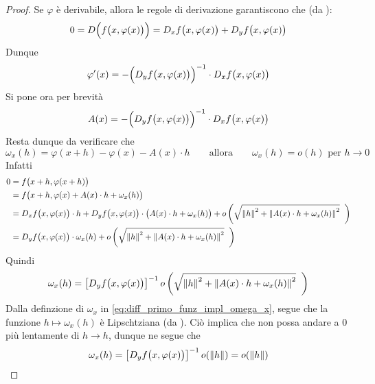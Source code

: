 \begin{theorem}
\begin{proof}
		Se $\varphi$ è derivabile, allora le regole di derivazione garantiscono che (da ):
		\[0 = D \Bigl( f \bigl( x, \varphi(x) \bigr) \Bigr) = D_xf \bigl( x, \varphi(x) \bigr) + D_yf \bigl( x, \varphi(x) \bigr)\]
		Dunque
		\[\varphi'(x) = -\Bigl( D_yf \bigl( x, \varphi(x) \bigr) \Bigr)^{-1} \cdot D_xf \bigl( x, \varphi(x) \bigr)\]
		Si pone ora per brevità
		\[A(x) = - \Bigl( D_yf \bigl( x, \varphi(x) \bigr) \Bigr)^{-1} \cdot D_xf \bigl( x, \varphi(x) \bigr)\]
		Resta dunque da verificare che
		\begin{equation}
			\label{eq:diff_primo_funz_impl_omega_x}
			\omega_x(h) = \varphi(x + h) - \varphi(x) - A(x) \cdot h \qquad \text{allora} \qquad \omega_x(h) = o(h) \text{ per } h \to 0
		\end{equation}
		Infatti
		\begin{align*}
			0 &= f \bigl( x + h, \varphi(x + h) \bigr)\\
			&= f \bigl( x + h, \varphi(x) + A(x) \cdot h + \omega_x(h) \bigr)\\
			&= D_xf \bigl( x, \varphi(x) \bigr) \cdot h + D_yf \bigl( x, \varphi(x) \bigr) \cdot \bigl( A(x) \cdot h + \omega_x(h) \bigr) + o \left( \sqrt{ \left\|h\right\|^2 + \left\|A(x) \cdot h + \omega_x(h)\right\|^2 } \;\; \right)\\
			&= D_yf \bigl( x, \varphi(x) \bigr) \cdot \omega_x(h) + o \left( \sqrt{ \left\|h\right\|^2 + \left\|A(x) \cdot h + \omega_x(h)\right\|^2 } \;\; \right)
		\end{align*}
		Quindi
		\[\omega_x(h) = \left[ D_yf \bigl( x, \varphi(x) \bigr) \right]^{-1} o \left( \sqrt{ \left\|h\right\|^2 + \left\|A(x) \cdot h + \omega_x(h)\right\|^2 } \;\; \right)\]
		Dalla definzione di $\omega_x$ in \cref{eq:diff_primo_funz_impl_omega_x}, segue che la funzione $h \mapsto \omega_x(h)$ è Lipschtziana (da ). Ciò implica che non possa andare a $0$ più lentamente di $h \to h$, dunque ne segue che
		\[\omega_x(h) = \left[ D_yf \bigl( x, \varphi(x) \bigr) \right]^{-1} o(\left\|h\right\|) = o(\left\|h\right\|)\]
		\cbend
	\end{proof}
\end{theorem}
